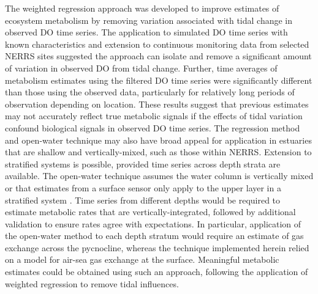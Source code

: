 \documentclass[letterpaper,12pt,oneside]{article}\usepackage[]{graphicx}\usepackage[]{color}
\begin{document}
The weighted regression approach was developed to improve estimates of ecosystem metabolism by removing variation associated with tidal change in observed \ac{DO} time series.  The application to simulated \ac{DO} time series with known characteristics and extension to continuous monitoring data from selected \ac{NERRS} sites suggested the approach can isolate and remove a significant amount of variation in observed \ac{DO} from tidal change.  Further, time averages of metabolism estimates using the filtered \ac{DO} time series were significantly different than those using the observed data, particularly for relatively long periods of observation depending on location. These results suggest that previous estimates may not accurately reflect true metabolic signals if the effects of tidal variation confound biological signals in observed \ac{DO} time series.  The regression method and open-water technique may also have broad appeal for application in estuaries that are shallow and vertically-mixed, such as those within \ac{NERRS}.  Extension to stratified systems is possible, provided time series across depth strata are available.  The open-water technique assumes the water column is vertically mixed or that estimates from a surface sensor only apply to the upper layer in a stratified system \citep{Staehr10,Kemp12}.  Time series from different depths would be required to estimate metabolic rates that are vertically-integrated, followed by additional validation to ensure rates agree with expectations.  In particular, application of the open-water method to each depth stratum would require an estimate of gas exchange across the pycnocline, whereas the technique implemented herein relied on a model for air-sea gas exchange at the surface.  Meaningful metabolic estimates could be obtained using such an approach, following the application of weighted regression to remove tidal influences.
\end{document}

